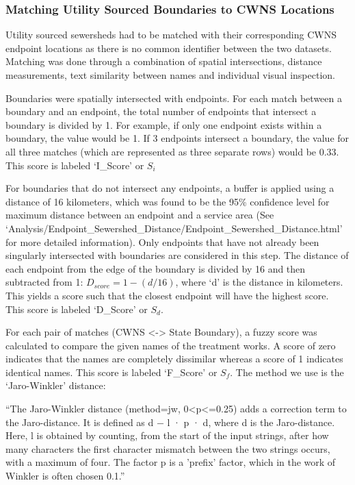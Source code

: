 \documentclass[
  letterpaper,
  DIV=11,
  numbers=noendperiod]{scrartcl}
\begin{document}
\subsubsection{Matching Utility Sourced Boundaries to CWNS
Locations}\label{matching-utility-sourced-boundaries-to-cwns-locations}

Utility sourced sewersheds had to be matched with their corresponding
CWNS endpoint locations as there is no common identifier between the two
datasets. Matching was done through a combination of spatial
intersections, distance measurements, text similarity between names and
individual visual inspection.

Boundaries were spatially intersected with endpoints. For each match
between a boundary and an endpoint, the total number of endpoints that
intersect a boundary is divided by 1. For example, if only one endpoint
exists within a boundary, the value would be 1. If 3 endpoints intersect
a boundary, the value for all three matches (which are represented as
three separate rows) would be 0.33. This score is labeled `I\_Score' or
\(S_i\)

For boundaries that do not intersect any endpoints, a buffer is applied
using a distance of 16 kilometers, which was found to be the 95\%
confidence level for maximum distance between an endpoint and a service
area (See
`Analysis/Endpoint\_Sewershed\_Distance/Endpoint\_Sewershed\_Distance.html'
for more detailed information). Only endpoints that have not already
been singularly intersected with boundaries are considered in this step.
The distance of each endpoint from the edge of the boundary is divided
by 16 and then subtracted from 1: \(D_{score}=1-(d/16)\), where `d' is
the distance in kilometers. This yields a score such that the closest
endpoint will have the highest score. This score is labeled `D\_Score'
or \(S_d\).

For each pair of matches (CWNS \textless-\textgreater{} State Boundary),
a fuzzy score was calculated to compare the given names of the treatment
works. A score of zero indicates that the names are completely
dissimilar whereas a score of 1 indicates identical names. This score is
labeled `F\_Score' or \(S_f\). The method we use is the `Jaro-Winkler'
distance:

``The Jaro-Winkler distance (method=jw, 0\textless p\textless=0.25) adds
a correction term to the Jaro-distance. It is defined as d − l · p · d,
where d is the Jaro-distance. Here, l is obtained by counting, from the
start of the input strings, after how many characters the first
character mismatch between the two strings occurs, with a maximum of
four. The factor p is a 'prefix' factor, which in the work of Winkler is
often chosen 0.1.''
\end{document}
